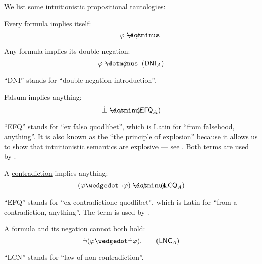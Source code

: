 \begin{proposition}\label{thm:intuitionistic_tautologies}
  We list some \hyperref[def:propositional_semantics/intuitionistic]{intuitionistic} propositional \hyperref[def:propositional_tautology]{tautologies}:
  \begin{thmenum}
     Every formula implies itself:
    \begin{equation}\label{eq:thm:intuitionistic_tautologies/self}
      \varphi \synimplies \varphi.
    \end{equation}

     Any formula implies its double negation:
    \begin{equation}\label{eq:thm:intuitionistic_tautologies/dni}
      \varphi \synimplies \neg \neg \varphi \tag{\( \logic{DNI}_A \)}
    \end{equation}

    \enquote{DNI} stands for \enquote{double negation introduction}.

     Falsum implies anything:
    \begin{equation}\label{eq:thm:intuitionistic_tautologies/efq}
      \synbot \synimplies \varphi \tag{\( \logic{EFQ}_A \)}
    \end{equation}

    \enquote{EFQ} stands for \enquote{ex falso quodlibet}, which is Latin for \enquote{from falsehood, anything}. It is also known as the \enquote{the principle of explosion} because it allows us to show that intuitionistic semantics are \hyperref[def:paraconsistent_consequence_operator]{explosive} --- see . Both terms are used by .

     A \hyperref[def:propositional_contradiction]{contradiction} implies anything:
    \begin{equation}\label{eq:thm:intuitionistic_tautologies/ecq}
      (\varphi \synwedge \neg \varphi) \synimplies \psi \tag{\( \logic{ECQ}_A \)}
    \end{equation}

    \enquote{EFQ} stands for \enquote{ex contradictione quodlibet}, which is Latin for \enquote{from a contradiction, anything}. The term is used by .

     A formula and its negation cannot both hold:
    \begin{equation}\label{eq:thm:intuitionistic_tautologies/lnc}
      \synneg (\varphi \synwedge \synneg \varphi). \tag{\( \logic{LNC}_A \)}
    \end{equation}

    \enquote{LCN} stands for \enquote{law of non-contradiction}.
  \end{thmenum}
\end{proposition}
